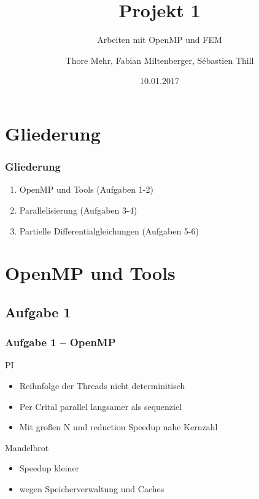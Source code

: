 \documentclass[german,notes,18pt]{beamer}
\title{Projekt 1}
\subtitle{Arbeiten mit OpenMP und FEM}
\author{Thore Mehr, Fabian Miltenberger, Sébastien Thill}
\date{10.01.2017}
\institute{Lehrstuhl für Rechnerarchitektur und Parallelverarbeitung (ITEC)}
\begin{document}
	
	\frame{\titlepage}
	
	\section{Gliederung}
	\begin{frame}
		\frametitle{Gliederung}
		
		\begin{enumerate}
			\item OpenMP und Tools (Aufgaben 1-2)
			\item Parallelisierung (Aufgaben 3-4)
			\item Partielle Differentialgleichungen (Aufgaben 5-6)
		\end{enumerate}
	\end{frame}

	\section{OpenMP und Tools}
	\subsection{Aufgabe 1}
	\begin{frame}
		\frametitle{Aufgabe 1 -- OpenMP}
		PI\\
		\begin{itemize}
			\item Reihnfolge der Threads nicht determinitisch
			\item Per Crital parallel langsamer als sequenziel
			\item Mit großen N und reduction Speedup nahe Kernzahl
		\end{itemize}
		Mandelbrot\\
		\begin{itemize}
			\item Speedup kleiner
			\item wegen Speicherverwaltung und Caches
		\end{itemize}
	\end{frame}
\end{document}

